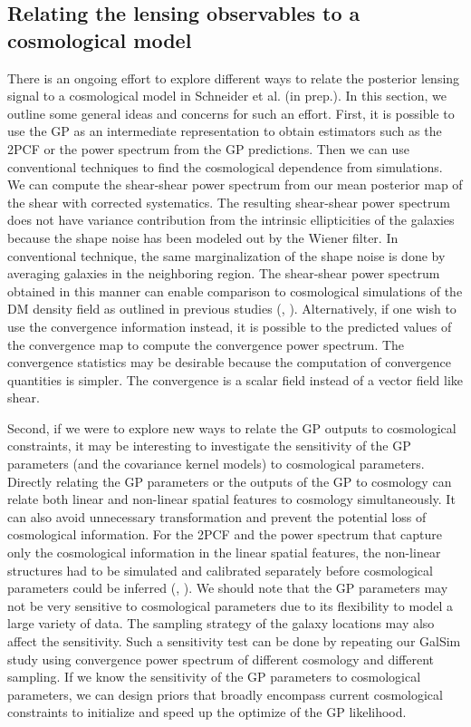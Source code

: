\subsection{Relating the lensing observables to a cosmological model}
There is an ongoing effort to explore different ways to relate the posterior lensing signal 
to a cosmological model in Schneider et al. (in prep.). 
In this section, we outline some general ideas and concerns for such an effort. 
First, it is possible to use the GP as an intermediate representation to 
obtain estimators such as the 2PCF or the power spectrum from the GP predictions. 
Then we can use conventional techniques 
 to find the cosmological dependence from simulations.  
We can compute the shear-shear power spectrum from our mean posterior map of the shear with
corrected systematics. 
The resulting shear-shear power spectrum does not have variance contribution from the 
intrinsic ellipticities of the galaxies because the shape noise has been modeled
out by the Wiener filter. In conventional technique, the same marginalization
of the shape noise is done by averaging galaxies in the neighboring region.
The shear-shear power spectrum obtained in this manner can enable comparison to
cosmological simulations of the DM density field as outlined in previous studies (\citealt{Jee2013a},
\citealt{Semboloni2007}). Alternatively, if one wish to use the convergence
information instead, it is possible to the predicted values of the convergence
map to compute the convergence power spectrum. The convergence statistics may
be desirable because the computation of convergence quantities is simpler. The
convergence is a scalar field instead of a vector field like shear. 

Second, if we were to explore new ways to relate the GP outputs to cosmological constraints,  
it may be interesting to investigate the sensitivity of the GP parameters (and
the covariance kernel models) to cosmological parameters. 
Directly relating the GP parameters or the outputs of the GP to cosmology can
relate both linear and non-linear spatial features to cosmology simultaneously.
It can also avoid unnecessary transformation and prevent the potential loss of cosmological 
information. 
For the 2PCF and the power spectrum that capture only the cosmological
information in the linear spatial features, the non-linear structures had to be 
simulated and calibrated separately before cosmological parameters could be inferred 
(\citealt{Kilbinger2015}, \citealt{Jee2013a}).
We should note that the GP parameters may not be very sensitive to cosmological parameters
due to its flexibility to model a large variety of data. The sampling strategy of
the galaxy locations may also affect the sensitivity. Such a sensitivity test can be
done by repeating our {\sc GalSim} study using convergence power spectrum of different cosmology 
and different sampling. 
If we know the sensitivity of the GP parameters to cosmological parameters, 
we can design priors that broadly encompass current cosmological constraints 
to initialize and speed up the optimize of the GP likelihood. 

